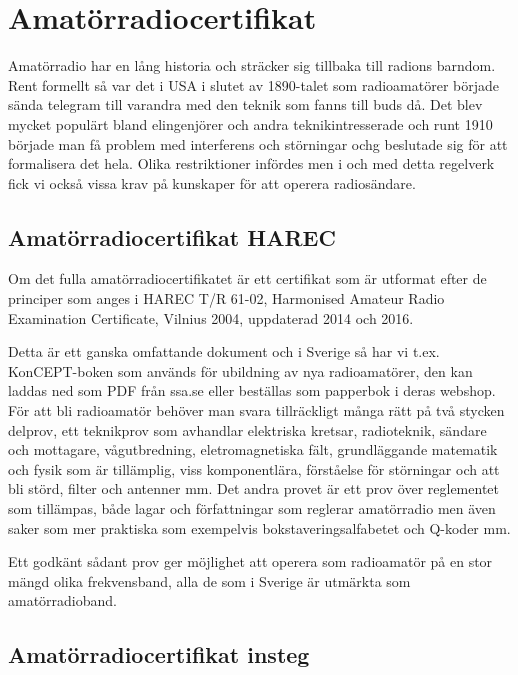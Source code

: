 \section{Amatörradiocertifikat}

Amatörradio har en lång historia och sträcker sig tillbaka till radions
barndom. Rent formellt så var det i USA i slutet av 1890-talet som
radioamatörer började sända telegram till varandra med den teknik som fanns
till buds då. Det blev mycket populärt bland elingenjörer och andra
teknikintresserade och runt 1910 började man få problem med interferens och
störningar ochg beslutade sig för att formalisera det hela. Olika
restriktioner infördes men i och med detta regelverk fick vi också vissa krav
på kunskaper för att operera radiosändare.

\subsection{Amatörradiocertifikat HAREC}

Om det fulla amatörradiocertifikatet är ett certifikat som är utformat efter
de principer som anges i HAREC T/R 61-02, Harmonised Amateur Radio Examination
Certificate, Vilnius 2004, uppdaterad 2014 och 2016.

Detta är ett ganska omfattande dokument och i Sverige så har vi t.ex.
KonCEPT-boken som används för ubildning av nya radioamatörer, den kan laddas
ned som PDF från ssa.se eller beställas som papperbok i deras webshop. För att
bli radioamatör behöver man svara tillräckligt många rätt på två stycken
delprov, ett teknikprov som avhandlar elektriska kretsar, radioteknik, sändare
och mottagare, vågutbredning, eletromagnetiska fält, grundläggande matematik
och fysik som är tillämplig, viss komponentlära, förståelse för störningar och
att bli störd, filter och antenner mm. Det andra provet är ett prov över
reglementet som tillämpas, både lagar och författningar som reglerar
amatörradio men även saker som mer praktiska som exempelvis
bokstaveringsalfabetet och Q-koder mm.

Ett godkänt sådant prov ger möjlighet att operera som radioamatör på en stor
mängd olika frekvensband, alla de som i Sverige är utmärkta som
amatörradioband.

\subsection{Amatörradiocertifikat insteg}
\label{sec:instegscertifikat}

